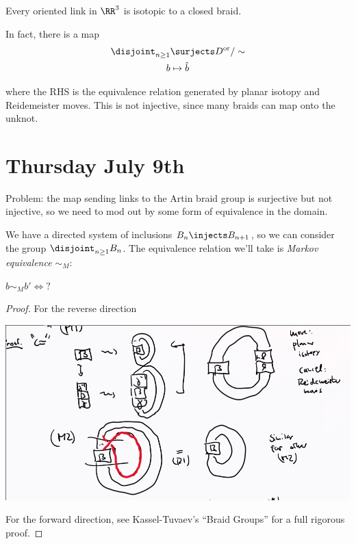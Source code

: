 \begin{theorem}[?]

Every oriented link in \(\RR^3\) is isotopic to a closed braid.

\end{theorem}

\begin{remark}

In fact, there is a map
\begin{align*}
\disjoint_{n\geq 1} &\surjects D^{\text{or}} /\sim \\
b & \mapsto \hat b
\end{align*}

where the RHS is the equivalence relation generated by planar isotopy
and Reidemeister moves. This is not injective, since many braids can map
onto the unknot.

\end{remark}

\hypertarget{thursday-july-9th}{%
\section{Thursday July 9th}\label{thursday-july-9th}}

Problem: the map sending links to the Artin braid group is surjective
but not injective, so we need to mod out by some form of equivalence in
the domain.

We have a directed system of inclusions \(B_n \injects B_{n+1}\), so we
can consider the group \(\disjoint_{n\geq 1} B_n\). The equivalence
relation we'll take is \emph{Markov equivalence} \(\sim_M\):

\begin{theorem}[?]

\(b \sim_M b' \iff ?\)

\end{theorem}

\begin{proof}

For the reverse direction

\includegraphics{figures/image_2020-07-09-11-17-40.png}

For the forward direction, see Kassel-Tuvaev's ``Braid Groups'' for a
full rigorous proof.

\end{proof}

